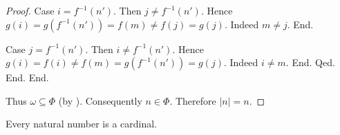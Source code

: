 \documentclass[10pt]{article}
\begin{document}
\begin{forthel}
\begin{proof}
            Case $i = f^{-1}(n')$.
              Then $j \neq f^{-1}(n')$.
              Hence $g(i)
                = g(f^{-1}(n'))
                = f(m)
                \neq f(j)
                = g(j)$.
              Indeed $m \neq j$.
            End.

            Case $j = f^{-1}(n')$.
              Then $i \neq f^{-1}(n')$.
              Hence $g(i)
                = f(i)
                \neq f(m)
                = g(f^{-1}(n'))
                = g(j)$.
              Indeed $i \neq m$.
            End.
          Qed.
        End.
      End.

      Thus $\omega \subseteq \Phi$ (by ).
      Consequently $n \in \Phi$.
      Therefore $|n| = n$.
    \end{proof}
  \end{forthel}

  \begin{forthel}
    \begin{corollary}
      Every natural number is a cardinal.
    \end{corollary}
  \end{forthel}
\end{document}
